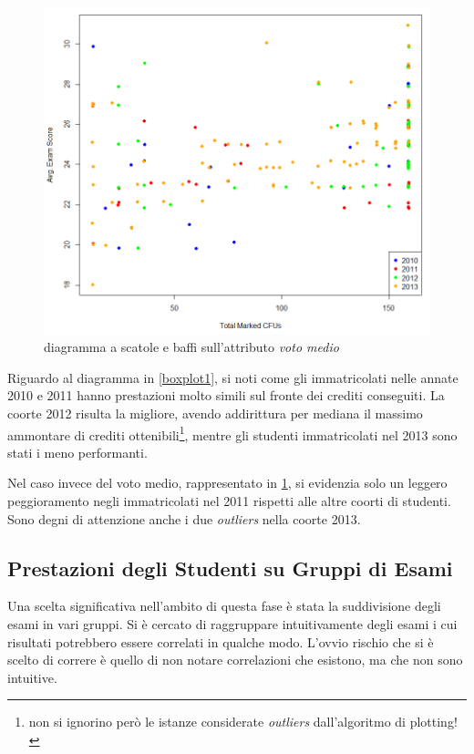 \begin{figure}
    \centering
    \caption{diagramma a scatole e baffi sull'attributo \textit{voto medio}}
    \label{boxplot2}
	\includegraphics[scale=0.5]{img/scatter_plot_3.png}
\end{figure}

Riguardo al diagramma in \ref{boxplot1}, si noti come gli immatricolati nelle annate 2010 e 2011 hanno prestazioni molto simili sul fronte dei crediti conseguiti. La coorte 2012 risulta la migliore, avendo addirittura per mediana il massimo ammontare di crediti ottenibili\footnote{non si ignorino però le istanze considerate \textit{outliers} dall’algoritmo di plotting!}, mentre gli studenti immatricolati nel 2013 sono stati i meno performanti.

Nel caso invece del voto medio, rappresentato in \ref{boxplot2}, si evidenzia solo un leggero peggioramento negli immatricolati nel 2011 rispetti alle altre coorti di studenti. Sono degni di attenzione anche i due \textit{outliers} nella coorte 2013.

\subsection{Prestazioni degli Studenti su Gruppi di Esami}

Una scelta significativa nell’ambito di questa fase è stata la suddivisione degli esami in vari gruppi. Si è cercato di raggruppare intuitivamente degli esami i cui risultati potrebbero essere correlati in qualche modo. L’ovvio rischio che si è scelto di correre è quello di non notare correlazioni che esistono, ma che non sono intuitive. \\

